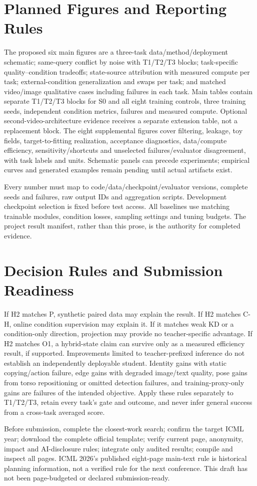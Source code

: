 \documentclass[11pt]{article}
\begin{document}
\section{Planned Figures and Reporting Rules}
The proposed six main figures are a three-task data/method/deployment schematic; same-query conflict by noise with T1/T2/T3 blocks; task-specific quality--condition tradeoffs; state-source attribution with measured compute per task; external-condition generalization and swaps per task; and matched video/image qualitative cases including failures in each task. Main tables contain separate T1/T2/T3 blocks for S0 and all eight training controls, three training seeds, independent condition metrics, failures and measured compute. Optional second-video-architecture evidence receives a separate extension table, not a replacement block. The eight supplemental figures cover filtering, leakage, toy fields, target-to-fitting realization, acceptance diagnostics, data/compute efficiency, sensitivity/shortcuts and unselected failures/evaluator disagreement, with task labels and units. Schematic panels can precede experiments; empirical curves and generated examples remain pending until actual artifacts exist.

Every number must map to code/data/checkpoint/evaluator versions, complete seeds and failures, raw output IDs and aggregation scripts. Development checkpoint selection is fixed before test access. All baselines use matching trainable modules, condition losses, sampling settings and tuning budgets. The project result manifest, rather than this prose, is the authority for completed evidence.

\section{Decision Rules and Submission Readiness}
If H2 matches P, synthetic paired data may explain the result. If H2 matches C-H, online condition supervision may explain it. If it matches weak KD or a condition-only direction, projection may provide no teacher-specific advantage. If H2 matches O1, a hybrid-state claim can survive only as a measured efficiency result, if supported. Improvements limited to teacher-prefixed inference do not establish an independently deployable student. Identity gains with static copying/action failure, edge gains with degraded image/text quality, pose gains from torso repositioning or omitted detection failures, and training-proxy-only gains are failures of the intended objective. Apply these rules separately to T1/T2/T3, retain every task's gate and outcome, and never infer general success from a cross-task averaged score.

Before submission, complete the closest-work search; confirm the target ICML year; download the complete official template; verify current page, anonymity, impact and AI-disclosure rules; integrate only audited results; compile and inspect all pages. ICML 2026's published eight-page main-text rule is historical planning information, not a verified rule for the next conference. This draft has not been page-budgeted or declared submission-ready.
\end{document}
